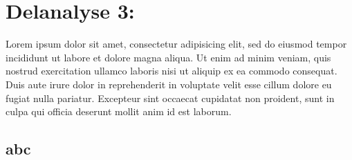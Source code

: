

\chapter{Delanalyse 3:  \label{abc}}

Lorem ipsum dolor sit amet, consectetur adipisicing elit, sed do eiusmod tempor incididunt ut labore et dolore magna aliqua. Ut enim ad minim veniam, quis nostrud exercitation ullamco laboris nisi ut aliquip ex ea commodo consequat. Duis aute irure dolor in reprehenderit in voluptate velit esse cillum dolore eu fugiat nulla pariatur. Excepteur sint occaecat cupidatat non proident, sunt in culpa qui officia deserunt mollit anim id est laborum.


\section{abc \label{abc}}
